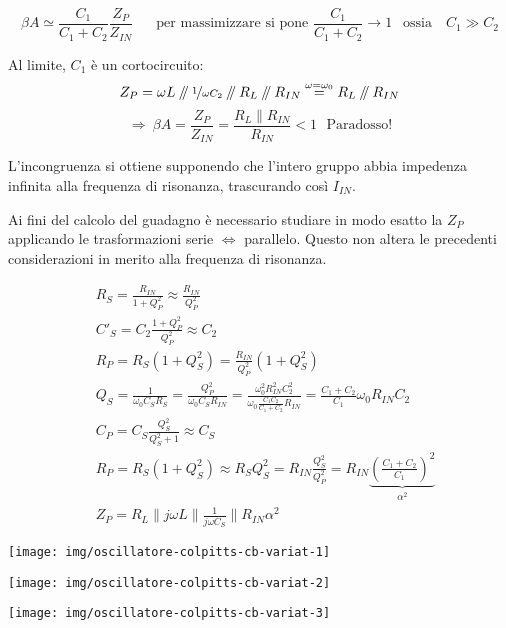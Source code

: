 
$$\beta A \simeq \frac{C_1}{C_1 + C_2} \frac{Z_P}{Z_{IN}} ~~~~~~
\mbox{ per massimizzare si pone } \frac{C_1}{C_1 + C_2} \rightarrow 1 ~~ \mbox{ ossia } ~~~
C_1 \gg C_2$$

Al limite, $C_1$ è un cortocircuito:
$$Z_P = \omega L \parallel \nicefrac{1}{\omega C_2} \parallel R_L \parallel R_{IN} \overset{\omega = \omega_0}{=} R_L \parallel R_{IN}$$
$$\Rightarrow ~ \beta A = \frac{Z_P}{Z_{IN}} =
\frac{R_L \parallel R_{IN}}{R_{IN}} < 1 ~~~
\mbox{Paradosso!}$$

L'incongruenza si ottiene supponendo che l'intero gruppo abbia impedenza infinita alla frequenza di risonanza, trascurando così $I_{IN}$.

Ai fini del calcolo del guadagno è necessario studiare in modo esatto la $Z_P$ applicando le trasformazioni serie $\Leftrightarrow$ parallelo. Questo non altera le precedenti considerazioni in merito alla frequenza di risonanza.

\begin{minipage}{0.7\linewidth}
\begin{align*}
&R_S = \frac{R_{IN}}{1 + Q_P^2} \approx \frac{R_{IN}}{Q_P^2}
\\
&C'_S = C_2 \frac{1 + Q_P^2}{Q_P^2} \approx C_2
\\
&R_P = R_S (1 + Q_S^2) = \frac{R_{IN}}{Q_P^2} (1 + Q_S^2)
\\
&Q_S = \frac{1}{\omega_0 C_S R_S} = \frac{Q_P^2}{\omega_0 C_S R_{IN}} = 
\frac{\omega_0^2 R_{IN}^2 C_2^2}{\omega_0 \frac{C_1 C_2}{C_1 + C_2} R_{IN}} = \frac{C_1 + C_2}{C_1} \omega_0 R_{IN} C_2
\\
&C_P = C_S \frac{Q_S^2}{Q_S^2 + 1} \approx C_S
\\
&R_P = R_S (1+Q_S^2) \approx R_S Q_S^2 = R_{IN} \frac{Q_S^2}{Q_P^2} = R_{IN} \underbrace{\left(\frac{C_1 + C_2}{C_1} \right) ^2}_{\alpha^2}
\\
&Z_P = R_L \parallel j \omega L \parallel
\frac{1}{j \omega C_S} \parallel R_{IN} \alpha^2
\end{align*}
\end{minipage}
\begin{minipage}{0.3\linewidth}
\texttt{[image: img/oscillatore-colpitts-cb-variat-1]}

\vspace{1em}

\texttt{[image: img/oscillatore-colpitts-cb-variat-2]}

\vspace{1em}

\texttt{[image: img/oscillatore-colpitts-cb-variat-3]}
\end{minipage}

